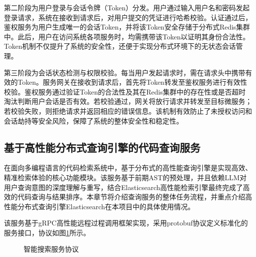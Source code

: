 \documentclass[UTF8,a4paper,12pt]{ctexart}
\numberwithin{equation}{section}
\begin{document}
第二阶段为用户登录与会话令牌（Token）分发。用户通过输入用户名和密码发起登录请求，系统在接收到请求后，对用户提交的凭证进行哈希校验。认证通过后，鉴权服务为用户生成唯一的会话Token，并将该Token安全存储于分布式Redis集群中。此后，用户在访问系统各项服务时，均需携带该Token以证明其身份合法性。Token机制不仅提升了系统的安全性，还便于实现分布式环境下的无状态会话管理。\par
第三阶段为会话状态检测与权限校验。每当用户发起请求时，需在请求头中携带有效的Token。服务网关在接收到请求后，首先将Token转发至鉴权服务进行有效性校验。鉴权服务通过验证Token的合法性及其在Redis集群中的存在性或是否超时淘汰判断用户会话是否有效。若校验通过，网关将放行请求并转发至目标微服务；若校验失败，则拒绝请求并返回相应的错误信息。该机制有效防止了未授权访问和会话劫持等安全风险，保障了系统的整体安全性和稳定性。
\subsection{基于高性能分布式查询引擎的代码查询服务}
在面向多编程语言的代码检索系统中，基于分布式的高性能查询引擎是实现高效、精准检索体验的核心功能模块。该服务基于前期AST的预处理，并且依赖LLM对用户查询意图的深度理解与重写，结合Elasticsearch高性能检索引擎最终完成了高效的代码查询与结果排序。本章节将介绍查询服务的整体任务流程，并重点介绍高性能分布式查询引擎Elasticsearch在本项目中的具体使用情况。\par
该服务基于gRPC高性能远程过程调用框架实现，采用protobuf协议定义标准化的服务接口，协议如图\ref{search_proto}所示。\par
\begin{figure}[H]
	\caption{智能搜索服务协议}
	\label{search_proto}
\end{figure}
\end{document}
